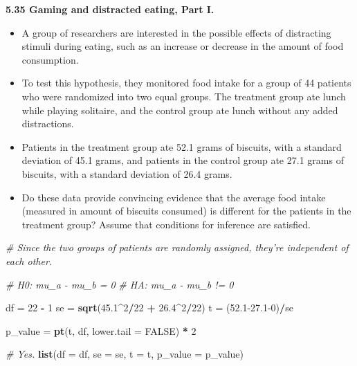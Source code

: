 \documentclass[]{book}
\newenvironment{Shaded}{\begin{snugshade}}{\end{snugshade}}
\newcommand{\CommentTok}[1]{\textcolor[rgb]{0.56,0.35,0.01}{\textit{#1}}}
\newcommand{\DataTypeTok}[1]{\textcolor[rgb]{0.13,0.29,0.53}{#1}}
\newcommand{\DecValTok}[1]{\textcolor[rgb]{0.00,0.00,0.81}{#1}}
\newcommand{\FloatTok}[1]{\textcolor[rgb]{0.00,0.00,0.81}{#1}}
\newcommand{\KeywordTok}[1]{\textcolor[rgb]{0.13,0.29,0.53}{\textbf{#1}}}
\newcommand{\NormalTok}[1]{#1}
\newcommand{\OperatorTok}[1]{\textcolor[rgb]{0.81,0.36,0.00}{\textbf{#1}}}
\newcommand{\OtherTok}[1]{\textcolor[rgb]{0.56,0.35,0.01}{#1}}
\newcommand{\StringTok}[1]{\textcolor[rgb]{0.31,0.60,0.02}{#1}}
\providecommand{\tightlist}{%
  \setlength{\itemsep}{0pt}\setlength{\parskip}{0pt}}
\begin{document}
\textbf{5.35 Gaming and distracted eating, Part I.}

\begin{itemize}
\tightlist
\item
  A group of researchers are interested in the possible effects of distracting stimuli during eating, such as an increase or decrease in the amount of food consumption.
\item
  To test this hypothesis, they monitored food intake for a group of 44 patients who were randomized into two equal groups. The treatment group ate lunch while playing solitaire, and the control group ate lunch without any added distractions.
\item
  Patients in the treatment group ate 52.1 grams of biscuits, with a standard deviation of 45.1 grams, and patients in the control group ate 27.1 grams of biscuits, with a standard deviation of 26.4 grams.
\item
  Do these data provide convincing evidence that the average food intake (measured in amount of biscuits consumed) is different for the patients in the treatment group? Assume that conditions for inference are satisfied.
\end{itemize}

\begin{Shaded}
\begin{Highlighting}[]
\CommentTok{# Since the two groups of patients are randomly assigned, they're independent of each other.}

\CommentTok{# H0: mu_a - mu_b = 0}
\CommentTok{# HA: mu_a - mu_b != 0}

\NormalTok{df =}\StringTok{ }\DecValTok{22} \OperatorTok{-}\StringTok{ }\DecValTok{1}
\NormalTok{se =}\StringTok{ }\KeywordTok{sqrt}\NormalTok{(}\FloatTok{45.1}\OperatorTok{^}\DecValTok{2}\OperatorTok{/}\DecValTok{22} \OperatorTok{+}\StringTok{ }\FloatTok{26.4}\OperatorTok{^}\DecValTok{2}\OperatorTok{/}\DecValTok{22}\NormalTok{)}
\NormalTok{t =}\StringTok{ }\NormalTok{(}\FloatTok{52.1-27.1}\DecValTok{-0}\NormalTok{)}\OperatorTok{/}\NormalTok{se}

\NormalTok{p_value =}\StringTok{ }\KeywordTok{pt}\NormalTok{(t, df, }\DataTypeTok{lower.tail =} \OtherTok{FALSE}\NormalTok{) }\OperatorTok{*}\StringTok{ }\DecValTok{2}

\CommentTok{# Yes.}
\KeywordTok{list}\NormalTok{(}\DataTypeTok{df =}\NormalTok{ df, }\DataTypeTok{se =}\NormalTok{ se, }\DataTypeTok{t =}\NormalTok{ t, }\DataTypeTok{p_value =}\NormalTok{ p_value)}
\end{Highlighting}
\end{Shaded}
\end{document}
